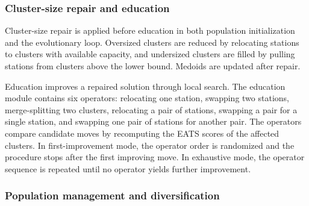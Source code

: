 \subsubsection{Cluster-size repair and education}\label{sec:hgs-euc-repair-education}

Cluster-size repair is applied before education in both population initialization
and the evolutionary loop. Oversized clusters are reduced by relocating stations
to clusters with available capacity, and undersized clusters are filled by
pulling stations from clusters above the lower bound. Medoids are updated after
repair.

Education improves a repaired solution through local search. The education
module contains six operators: relocating one station, swapping two stations,
merge-splitting two clusters, relocating a pair of stations, swapping a pair for
a single station, and swapping one pair of stations for another pair. The
operators compare candidate moves by recomputing the EATS scores of the affected
clusters. In first-improvement mode, the operator order is randomized and the
procedure stops after the first improving move. In exhaustive mode, the operator
sequence is repeated until no operator yields further improvement.

\subsubsection{Population management and diversification}\label{sec:hgs-euc-population}


